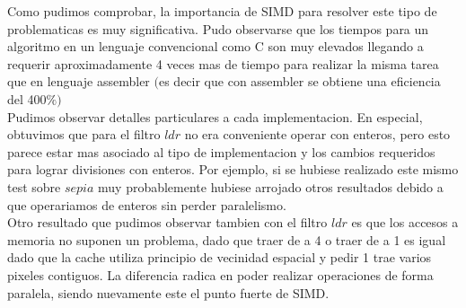 Como pudimos comprobar, la importancia de SIMD para resolver este tipo de problematicas es muy significativa. 
Pudo observarse que los tiempos para un algoritmo en un lenguaje convencional como C son muy elevados llegando a requerir aproximadamente 4 veces mas de tiempo para realizar la misma tarea que en lenguaje assembler $($es decir que con assembler se obtiene una eficiencia del 400$ \% )$\\

Pudimos observar detalles particulares a cada implementacion. En especial, obtuvimos que para el filtro $ldr$ no era conveniente operar con enteros, pero esto parece estar mas asociado al tipo de implementacion y los cambios requeridos para lograr divisiones con enteros. Por ejemplo, si se hubiese realizado este mismo test sobre $sepia$ muy probablemente hubiese arrojado otros resultados debido a que operariamos de enteros sin perder paralelismo.\\

Otro resultado que pudimos observar tambien con el filtro $ldr$ es que los accesos a memoria no suponen un problema, dado que traer de a 4 o traer de a 1 es igual dado que la cache utiliza principio de vecinidad espacial y pedir 1 trae varios pixeles contiguos. La diferencia radica en poder realizar operaciones de forma paralela, siendo nuevamente este el punto fuerte de SIMD. \\


